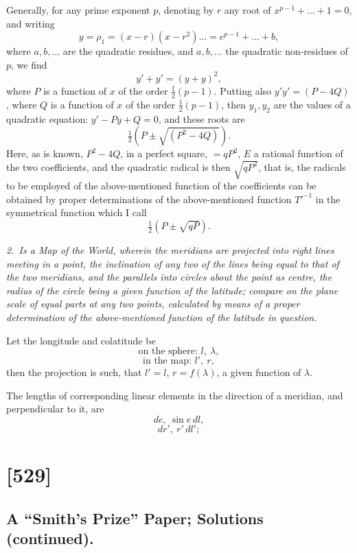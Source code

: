 \documentclass[11pt,a4paper]{book}
\begin{document}
Generally, for any prime exponent $p$, denoting by $r$ any root of $x^{p-1} + \ldots + 1 = 0$,
and writing
\[
y = \rho_1 = (x - r)(x - r^2) \ldots = e^{p - 1} + \ldots + b,
\]
where $a, b, \ldots$ are the quadratic residues, and $a, b, \ldots$ the quadratic non-residues of
$p$, we find
\[
y' + y' = (y + y)^2,
\]
where $P$ is a function of $x$ of the order $\frac{1}{2}(p - 1)$. Putting also $y' y' = (P - 4Q)$,
where $Q$ is a function of $x$ of the order $\frac{1}{2}(p - 1)$, then $y_1, y_2$ are the values
of a quadratic equation: $y' - P y + Q = 0$, and these roots are
\[
\tfrac{1}{2} (P \pm \sqrt{(P^2 - 4 Q)}).
\]
Here, as is known, $P^2 - 4 Q$, in a perfect square, $= q P^2$, $E$ a rational function of the
two coefficients, and the quadratic radical is then $\sqrt{q P^2}$, that is, the radicals to be employed
of the above-mentioned function of the coefficients can be obtained by proper determinations of
the above-mentioned function $T'^{-1}$ in the symmetrical function which I call
\[
\tfrac{1}{2} (P \pm \sqrt{q P}).
\]

\textit{2.\ Is a Map of the World, wherein the meridians are projected into right lines
meeting in a point, the inclination of any two of the lines being equal to that of the
two meridians, and the parallels into circles about the point as centre, the radius of
the circle being a given function of the latitude; compare on the plane scale of equal
parts at any two points, calculated by means of a proper determination of
the above-mentioned function of the latitude in question.}

Let the longitude and colatitude be
\[
\text{on the sphere: }l,\ \lambda,
\]
\[
\text{in the map: }l',\ r,
\]
then the projection is such, that $l' = l$, $r = f(\lambda)$, a given function of $\lambda$.

The lengths of corresponding linear elements in the direction of a meridian, and
perpendicular to it, are
\[
de,\ \sin e\,dl,
\]
\[
dr',\ r'\,dl';
\]
\clearpage


\section{[529]}
\subsection{A ``Smith's Prize'' Paper; Solutions (continued).}
\end{document}
